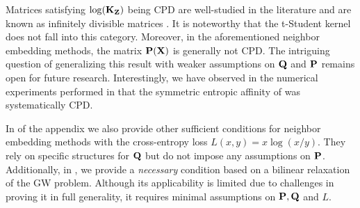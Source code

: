 Matrices satisfying $\log({\mathbf{K}}_{\mathbf{Z}})$ being CPD are well-studied in the literature
and are known as infinitely divisible matrices \citep{bhatia2006infinitely}. It
is noteworthy that the t-Student kernel does not fall into this category.
Moreover,  in the aforementioned neighbor embedding methods, the matrix
${\mathbf{P}}({\mathbf{X}})$ is generally not CPD. The intriguing question of generalizing this
result with weaker assumptions on ${\mathbf{Q}}$ and ${\mathbf{P}}$ remains open for future
research. Interestingly, we have observed in the numerical experiments performed in  that the
symmetric entropic affinity of \citet{van2023snekhorn} was systematically CPD. 

\begin{remark}
In  of the appendix we also provide other sufficient conditions for neighbor embedding methods with the cross-entropy loss $L(x,y) = x \log(x/y)$. They rely on specific structures for ${\mathbf{Q}}$ but do not impose any assumptions on ${\mathbf{P}}$. Additionally, in , we provide a \emph{necessary} condition based on a bilinear relaxation of the GW problem. Although its applicability is limited due to challenges in proving it in full generality, it requires minimal assumptions on ${\mathbf{P}}, {\mathbf{Q}}$ and $L$.
\end{remark} 








